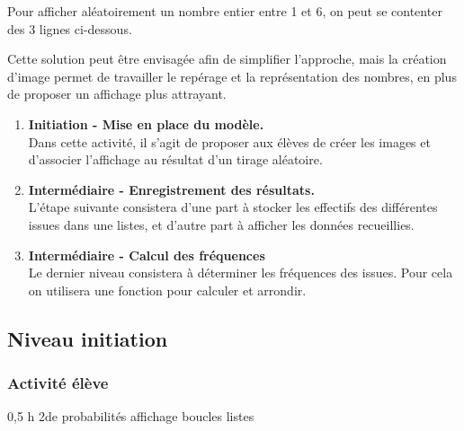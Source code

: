 \begin{methode}
    Pour afficher aléatoirement un nombre entier entre 1 et 6, on peut se contenter des 3 lignes ci-dessous.
    
    Cette solution peut être envisagée afin de simplifier l'approche, mais la création d'image permet de travailler le repérage et la représentation des nombres, en plus de proposer un affichage plus attrayant.
    
    \begin{enumerate}
        \item \textbf{Initiation - Mise en place du modèle.} \\
            Dans cette activité, il s'agit de proposer aux élèves de créer les images et d'associer l'affichage au résultat d'un tirage aléatoire.
        \item \textbf{Intermédiaire - Enregistrement des résultats.}\\
            L'étape suivante consistera d'une part à stocker les effectifs des différentes issues dans une listes, et d'autre part à afficher les données recueillies.
        \item \textbf{Intermédiaire - Calcul des fréquences}\\
            Le dernier niveau consistera à déterminer les fréquences des issues. Pour cela on utilisera une fonction pour calculer et arrondir.
        
    \end{enumerate}
\end{methode}

%
%

\newpage

\subsection{Niveau initiation}

\subsubsection{Activité élève}

\cartouche
{0,5 h}         %
{2de}           %
{probabilités}        %
{}     %
{affichage boucles listes }       %


